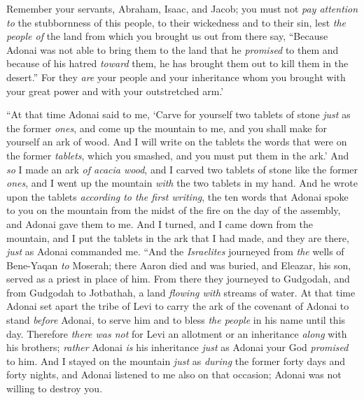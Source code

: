 \begin{biblechapter}
\verse Remember your servants, Abraham, Isaac, and Jacob; you must not \textit{pay attention to} the stubbornness of this people, to their wickedness and to their sin,
\verse lest \textit{the people of} the land from which you brought us out from there say, “Because Adonai was not able to bring them to the land that he \textit{promised} to them and because of his hatred \textit{toward} them, he has brought them out to kill them in the desert.”
\verse For they \textit{are} your people and your inheritance whom you brought with your great power and with your outstretched arm.’
\end{biblechapter}

\begin{biblechapter} %
\verse “At that time Adonai said to me, ‘Carve for yourself two tablets of stone \textit{just} as the former \textit{ones}, and come up the mountain to me, and you shall make for yourself an ark of wood.
\verse And I will write on the tablets the words that were on the former \textit{tablets}, which you smashed, and you must put them in the ark.’
\verse And \textit{so} I made an ark \textit{of acacia wood}, and I carved two tablets of stone like the former \textit{ones}, and I went up the mountain \textit{with} the two tablets in my hand.
\verse And he wrote upon the tablets \textit{according to the first writing}, the ten words that Adonai spoke to you on the mountain from the midst of the fire on the day of the assembly, and Adonai gave them to me.
\verse And I turned, and I came down from the mountain, and I put the tablets in the ark that I had made, and they are there, \textit{just} as Adonai commanded me.
\verse “And the \textit{Israelites} journeyed from \textit{the} wells of Bene-Yaqan \textit{to} Moserah; there Aaron died and was buried, and Eleazar, his son, served as a priest in place of him.
\verse From there they journeyed to Gudgodah, and from Gudgodah to Jotbathah, a land \textit{flowing with} streams of water.
\verse At that time Adonai set apart the tribe of Levi to carry the ark of the covenant of Adonai to stand \textit{before} Adonai, to serve him and to bless \textit{the people} in his name until this day.
\verse Therefore \textit{there was not} for Levi an allotment or an inheritance \textit{along} with his brothers; \textit{rather} Adonai \textit{is} his inheritance \textit{just} as Adonai your God \textit{promised} to him.
\verse And I stayed on the mountain \textit{just} as \textit{during} the former forty days and forty nights, and Adonai listened to me also on that occasion; Adonai was not willing to destroy you.

\end{biblechapter}
